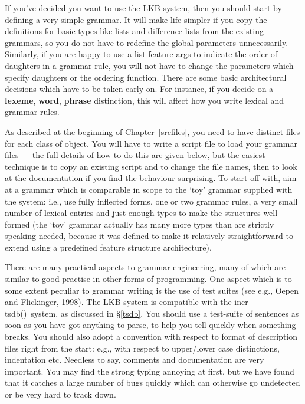 \documentclass[12pt]{report}
\newcommand{\itsdb}{{\sf \lbrack incr tsdb()\rbrack}}
\begin{document}
If you've decided you want to use the LKB system, then you should start by
defining a very simple grammar.  
It will make life simpler 
if you copy the definitions for basic types like lists and difference
lists from the existing grammars, so you do not have to redefine the
global parameters unnecessarily.  
Similarly, if you are happy to use a list feature {\sc args} to
indicate the order of daughters in a grammar rule, you will not
have to change the parameters which specify daughters or the
ordering function.
There are some basic architectural decisions
which have to be taken early on.  For instance, if you decide
on a {\bf lexeme}, {\bf word}, {\bf phrase} distinction, this will
affect how you write lexical and grammar rules.  

As described at the beginning of Chapter~\ref{srcfiles},
you need to have distinct files for each class of object. 
You will have to write a script 
file to load your grammar files --- the full details of how to
do this are given below, but the easiest technique is to copy
an existing script and to change the file names, then to look at the
documentation if you find the behaviour surprising.  To start off
with, aim at a grammar which is comparable in scope to the `toy' grammar
supplied with the system: i.e., use fully inflected forms, 
one or two grammar rules, a very small number
of lexical entries and just enough types to make the structures well-formed
(the `toy' grammar actually has many more types than are strictly 
speaking needed, because it was defined 
to make it relatively straightforward
to extend using a predefined feature structure architecture).

There are many practical aspects to grammar engineering, many of which
are similar to good practise in other forms of programming.
One aspect which is to some extent peculiar to grammar writing is the
use of test suites (see e.g., Oepen and Flickinger, 1998).
The LKB system is compatible with the \itsdb\  system, as discussed
in \S\ref{tsdb}.
You should use a test-suite of sentences as soon as you have got
anything to parse, to
help you tell quickly when something breaks.  You should also
adopt a convention with respect to format of description files right
from the start: e.g., with respect to upper/lower case distinctions,
indentation etc.  Needless to say, comments 
and documentation are very important.  
You may find the strong typing annoying at first, but we have found that
it catches a large number of bugs quickly which can otherwise go undetected
or be very hard to track down.  
\end{document}
